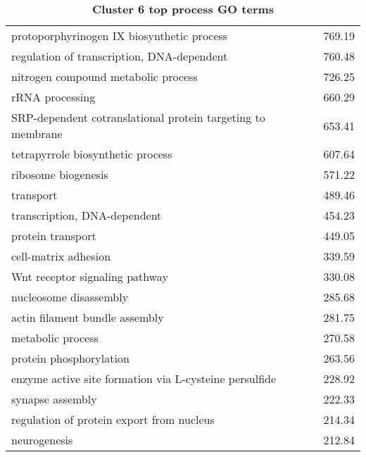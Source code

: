 \begin{table}[h]
\begin{center}
\begin{tabular}{@{}lc@{}}
protoporphyrinogen IX biosynthetic process                              & 769.19                      \\
regulation of transcription, DNA-dependent                              & 760.48                      \\
nitrogen compound metabolic process                                     & 726.25                      \\
rRNA processing                                                         & 660.29                      \\
SRP-dependent cotranslational protein targeting to membrane             & 653.41                      \\
tetrapyrrole biosynthetic process                                       & 607.64                      \\
ribosome biogenesis                                                     & 571.22                      \\
transport                                                               & 489.46                      \\
transcription, DNA-dependent                                            & 454.23                      \\
protein transport                                                       & 449.05                      \\
cell-matrix adhesion                                                    & 339.59                      \\
Wnt receptor signaling pathway                                          & 330.08                      \\
nucleosome disassembly                                                  & 285.68                      \\
actin filament bundle assembly                                          & 281.75                      \\
metabolic process                                                       & 270.58                      \\
protein phosphorylation                                                 & 263.56                      \\
enzyme active site formation via L-cysteine persulfide                  & 228.92                      \\
synapse assembly                                                        & 222.33                      \\
regulation of protein export from nucleus                               & 214.34                      \\
neurogenesis                                                            & 212.84                      \\ \bottomrule
\end{tabular}
\end{center}

\caption[Cluster 6 top process GO terms]{\sf \textbf{Cluster 6 top process GO terms}}
\label{tab:cls6-process}
\end{table}
